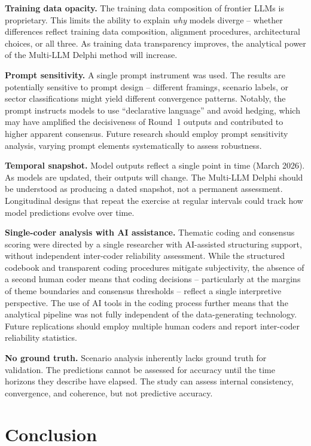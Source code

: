 \documentclass[preprint,review,12pt]{elsarticle}
\begin{document}
\textbf{Training data opacity.} The training data composition of frontier LLMs is proprietary. This limits the ability to explain \textit{why} models diverge -- whether differences reflect training data composition, alignment procedures, architectural choices, or all three. As training data transparency improves, the analytical power of the Multi-LLM Delphi method will increase.

\textbf{Prompt sensitivity.} A single prompt instrument was used. The results are potentially sensitive to prompt design -- different framings, scenario labels, or sector classifications might yield different convergence patterns. Notably, the prompt instructs models to use ``declarative language'' and avoid hedging, which may have amplified the decisiveness of Round~1 outputs and contributed to higher apparent consensus. Future research should employ prompt sensitivity analysis, varying prompt elements systematically to assess robustness.

\textbf{Temporal snapshot.} Model outputs reflect a single point in time (March 2026). As models are updated, their outputs will change. The Multi-LLM Delphi should be understood as producing a dated snapshot, not a permanent assessment. Longitudinal designs that repeat the exercise at regular intervals could track how model predictions evolve over time.

\textbf{Single-coder analysis with AI assistance.} Thematic coding and consensus scoring were directed by a single researcher with AI-assisted structuring support, without independent inter-coder reliability assessment. While the structured codebook and transparent coding procedures mitigate subjectivity, the absence of a second human coder means that coding decisions -- particularly at the margins of theme boundaries and consensus thresholds -- reflect a single interpretive perspective. The use of AI tools in the coding process further means that the analytical pipeline was not fully independent of the data-generating technology. Future replications should employ multiple human coders and report inter-coder reliability statistics.

\textbf{No ground truth.} Scenario analysis inherently lacks ground truth for validation. The predictions cannot be assessed for accuracy until the time horizons they describe have elapsed. The study can assess internal consistency, convergence, and coherence, but not predictive accuracy.



\section{Conclusion}
\label{sec:conclusion}
\end{document}
